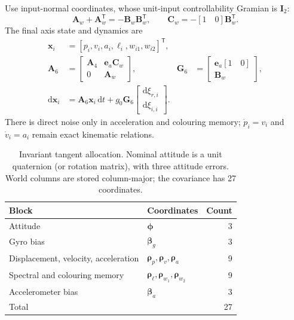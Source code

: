 \documentclass[conference]{IEEEtran}
\newcommand{\vc}[1]{\bm{#1}}
\newcommand{\mt}[1]{\bm{#1}}
\newcommand{\tr}{^{\mathsf T}}
\newcommand{\dd}{\mathrm d}
\begin{document}
Use input-normal coordinates, whose unit-input controllability Gramian is
$\mt I_2$:
\begin{equation}
 \mt A_w+\mt A_w\tr=-\mt B_w\mt B_w\tr,\qquad
 \mt C_w=-[1\quad0]\mt B_w\tr.
 \label{eq:inputnormal}
\end{equation}
The final axis state and dynamics are
\begin{align}
 \vc x_i&=[p_i,v_i,a_i,\ell_i,w_{i1},w_{i2}]\tr,\nonumber\\
 \mt A_6&=\begin{bmatrix}\mt A_4&\vc e_a\mt C_w\\0&\mt A_w\end{bmatrix},&
 \mt G_6&=\begin{bmatrix}\vc e_a[1\quad0]\\\mt B_w\end{bmatrix},\label{eq:A6}\\
 \dd\vc x_i&=\mt A_6\vc x_i\,\dd t+
                 g_0\mt G_6\begin{bmatrix}\dd\xi_{r,i}\\\dd\xi_{i,i}\end{bmatrix}.
 \nonumber
\end{align}
There is direct noise only in acceleration and colouring memory;
$\dot p_i=v_i$ and $\dot v_i=a_i$ remain exact kinematic relations.


\begin{table}[!t]\centering
\caption{Invariant tangent allocation. Nominal attitude is a unit quaternion
(or rotation matrix), with three attitude errors. World columns are stored
column-major; the covariance has 27 coordinates.}\label{tab:states}
\begin{tabular}{@{}llr@{}}\toprule
Block&Coordinates&Count\\\midrule
Attitude&$\vc\phi$&3\\
Gyro bias&$\vc\beta_g$&3\\
Displacement, velocity, acceleration&$\vc\rho_p,\vc\rho_v,\vc\rho_a$&9\\
Spectral and colouring memory&$\vc\rho_\ell,\vc\rho_{w_1},\vc\rho_{w_2}$&9\\
Accelerometer bias&$\vc\beta_a$&3\\\midrule
Total&&27\\\bottomrule
\end{tabular}\end{table}
\end{document}
